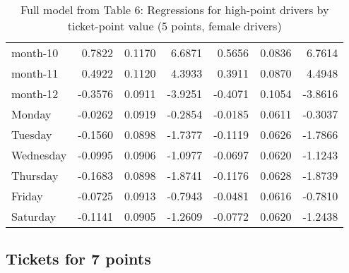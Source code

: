 \documentclass[10pt]{article}
\begin{document}
\begin{table}[ht]
\begin{tabular}{lrrrrrr}
  month-10 & 0.7822 & 0.1170 & 6.6871 & 0.5656 & 0.0836 & 6.7614 \\ 
  month-11 & 0.4922 & 0.1120 & 4.3933 & 0.3911 & 0.0870 & 4.4948 \\ 
  month-12 & -0.3576 & 0.0911 & -3.9251 & -0.4071 & 0.1054 & -3.8616 \\ 
  Monday & -0.0262 & 0.0919 & -0.2854 & -0.0185 & 0.0611 & -0.3037 \\ 
  Tuesday & -0.1560 & 0.0898 & -1.7377 & -0.1119 & 0.0626 & -1.7866 \\ 
  Wednesday & -0.0995 & 0.0906 & -1.0977 & -0.0697 & 0.0620 & -1.1243 \\ 
  Thursday & -0.1683 & 0.0898 & -1.8741 & -0.1176 & 0.0628 & -1.8739 \\ 
  Friday & -0.0725 & 0.0913 & -0.7943 & -0.0481 & 0.0616 & -0.7810 \\ 
  Saturday & -0.1141 & 0.0905 & -1.2609 & -0.0772 & 0.0620 & -1.2438 \\ 
   \hline
\end{tabular}
\caption{Full model from Table 6: Regressions for high-point drivers by ticket-point value (5 points, female drivers)} 
\label{tab_6_5_pts_no_age_F}
\end{table}


\clearpage
\pagebreak




\subsection{Tickets for 7 points}



\end{document}
